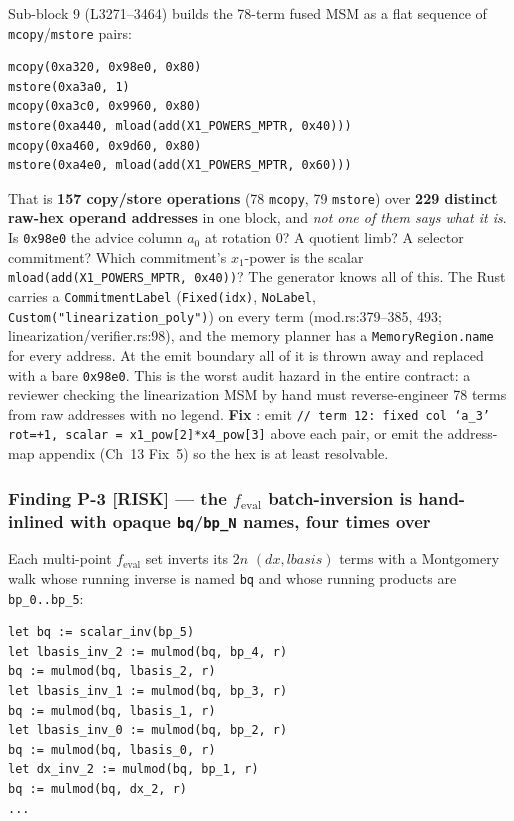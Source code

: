 Sub-block 9 (L3271--3464) builds the 78-term fused MSM as a flat
sequence of \texttt{mcopy}/\texttt{mstore} pairs:

\begin{lstlisting}[style=yul]
mcopy(0xa320, 0x98e0, 0x80)
mstore(0xa3a0, 1)
mcopy(0xa3c0, 0x9960, 0x80)
mstore(0xa440, mload(add(X1_POWERS_MPTR, 0x40)))
mcopy(0xa460, 0x9d60, 0x80)
mstore(0xa4e0, mload(add(X1_POWERS_MPTR, 0x60)))
\end{lstlisting}

That is \textbf{157 copy/store operations} (78 \texttt{mcopy}, 79
\texttt{mstore}) over \textbf{229 distinct raw-hex operand
addresses} in one block, and \emph{not one of them says what it
is}. Is \texttt{0x98e0} the advice column $a_0$ at rotation 0? A
quotient limb? A selector commitment? Which commitment's $x_1$-power
is the scalar \texttt{mload(add(X1\_\allowbreak{}POWERS\_\allowbreak{}MPTR, 0x40))}? The
generator knows all of this. The Rust carries a
\texttt{CommitmentLabel} (\texttt{Fixed(idx)}, \texttt{NoLabel},
\texttt{Custom("linearization\_\allowbreak{}poly")}) on every term
(mod.rs:379--385, 493; linearization/verifier.rs:98), and the memory
planner has a \texttt{MemoryRegion.name} for every address. At the
emit boundary all of it is thrown away and replaced with a bare
\texttt{0x98e0}. This is the worst audit hazard in the entire
contract: a reviewer checking the linearization MSM by hand must
reverse-engineer 78 terms from raw addresses with no legend.
\textbf{Fix} : emit
\texttt{/\allowbreak{}/\allowbreak{} term 12: fixed col `a\_\allowbreak{}3' rot=+1, scalar = x1\_\allowbreak{}pow[2]*x4\_\allowbreak{}pow[3]}
above each pair, or emit the address-map appendix (Ch~13 Fix~5) so
the hex is at least resolvable.

\subsubsection*{Finding P-3 \textcolor{rustorange}{[RISK]} --- the $f_{\text{eval}}$ batch-inversion is hand-inlined with opaque \texttt{bq}/\texttt{bp\_N} names, four times over}

Each multi-point $f_{\text{eval}}$ set inverts its $2n$
$(dx,lbasis)$ terms with a Montgomery walk whose running inverse is
named \texttt{bq} and whose running products are
\texttt{bp\_0..bp\_5}:

\begin{lstlisting}[style=yul]
let bq := scalar_inv(bp_5)
let lbasis_inv_2 := mulmod(bq, bp_4, r)
bq := mulmod(bq, lbasis_2, r)
let lbasis_inv_1 := mulmod(bq, bp_3, r)
bq := mulmod(bq, lbasis_1, r)
let lbasis_inv_0 := mulmod(bq, bp_2, r)
bq := mulmod(bq, lbasis_0, r)
let dx_inv_2 := mulmod(bq, bp_1, r)
bq := mulmod(bq, dx_2, r)
...
\end{lstlisting}

